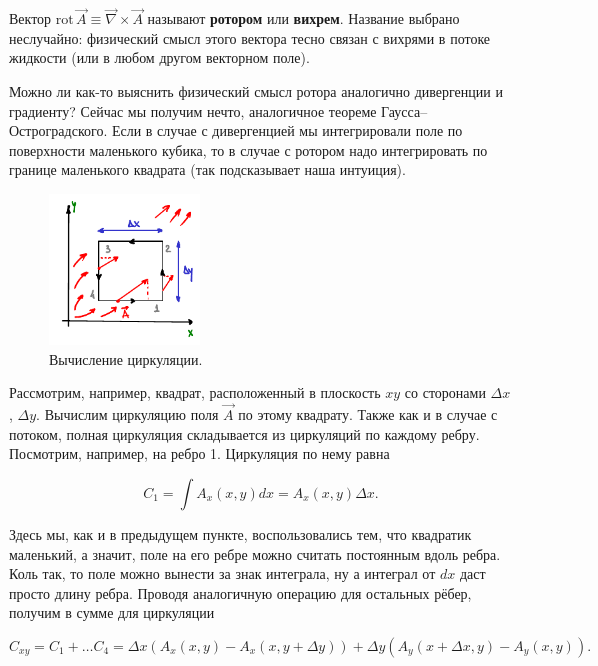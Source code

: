\documentclass[11pt,a4paper]{article}
\numberwithin{equation}{section}
\newcommand{\rot}{\mathrm{rot}\,}
\newcommand{\vn}{\vec{\nabla}}
\begin{document}
Вектор $\rot \vec{A} \equiv \vn \times \vec{A}$ называют
\textbf{ротором} или \textbf{вихрем}. Название выбрано неслучайно:
физический смысл этого вектора тесно связан с вихрями в потоке
жидкости (или в любом другом векторном поле).

Можно ли как-то выяснить физический смысл ротора аналогично
дивергенции и градиенту? Сейчас мы получим нечто, аналогичное теореме
Гаусса--Остроградского. Если в случае с дивергенцией мы интегрировали
поле по поверхности маленького кубика, то в случае с ротором надо
интегрировать по границе маленького квадрата (так подсказывает наша
интуиция).

\begin{figure}
  \vspace{-0.8cm}
  \begin{center}
    \includegraphics[width=4cm,height=4cm]{stokes.pdf}
  \end{center}
  \vspace{-0.7cm}
  \caption{Вычисление циркуляции.}
  \label{fig:stokes}
  \vspace{2cm}
\end{figure}


Рассмотрим, например, квадрат, расположенный в плоскость $xy$ со
сторонами $\Delta x$, $\Delta y$. Вычислим циркуляцию поля $\vec{A}$
по этому квадрату. Также как и в случае с потоком, полная циркуляция
складывается из циркуляций по каждому ребру. Посмотрим, например, на
ребро 1. Циркуляция по нему равна

\begin{equation}
  \label{eq:theorem_curl_1}
  C_1 = \int A_x (x,y) d x = A_x (x,y) \Delta x. 
\end{equation}

Здесь мы, как и в предыдущем пункте, воспользовались тем, что
квадратик маленький, а значит, поле на его ребре можно считать
постоянным вдоль ребра. Коль так, то поле можно вынести за знак
интеграла, ну а интеграл от $dx$ даст просто длину ребра. Проводя
аналогичную операцию для остальных рёбер, получим в сумме для
циркуляции

\begin{equation}
  \label{eq:theorem_curl_2}
  C_{xy} = C_1 + \ldots C_4 = \Delta x
  \left(
    A_x (x,y) - A_x(x,y+\Delta y)
  \right) + \Delta y
  \left(
    A_y (x+\Delta x, y) - A_y (x,y)
  \right).
\end{equation}
\end{document}
